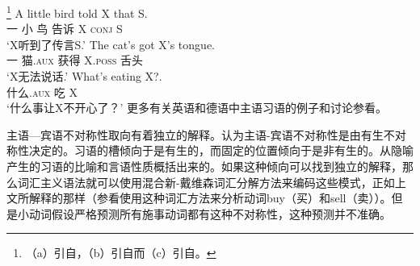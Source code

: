\footnote{%
（a）引自，（b）引自而（c）引自。
}
\eal
\ex\label{bird}
\gll A little bird told X that S.\\
     一 小 鸟 告诉 X \textsc{conj} S\\
\glt `X听到了传言S.'
\ex\label{cat-tounge}
\gll The cat's got X's tongue.\\
     一 猫.\textsc{aux} 获得 X.\textsc{poss} 舌头\\
\glt `X无法说话.'   
\ex\label{what-is-eating-x}
\gll What's eating X?.\\
     什么.\textsc{aux} 吃 X\\
\glt `什么事让X不开心了？'
\zl
更多有关英语和德语中主语习语的例子和讨论参看。

主语—宾语不对称性取向有着独立的解释。\citet*{NSW94a}认为主语-宾语不对称性是由有生不对称性决定的。习语的槽倾向于是有生的，而固定的位置倾向于是非有生的。\citet{NSW94a}从隐喻产生的习语的比喻和言语性质概括出来的。如果这种倾向可以找到独立的解释，那么词汇主义语法就可以使用混合新-戴维森词汇分解方法来编码这些模式，正如上文所解释的那样（参看\citet{Wechsler2005a}使用这种词汇方法来分析动词buy（买）和sell（卖））。但是小动词假设严格预测所有施事动词都有这种不对称性，这种预测并不准确。


